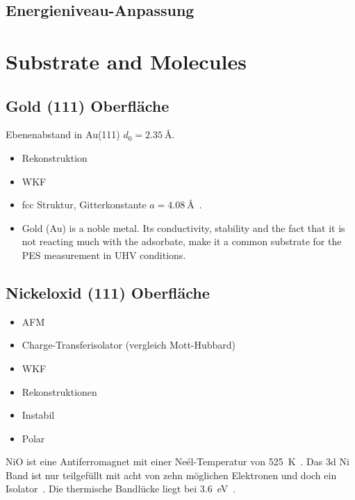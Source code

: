         \subsection{Energieniveau-Anpassung}

    \section{Substrate and Molecules}
        \subsection{Gold (111) Oberfläche}
            \textbf{\cite{5A_1}}
            Ebenenabstand in Au(111) $d_0 = \SI{2.35}{\angstrom}$.

            \begin{itemize}
                \item Rekonstruktion
                \item WKF
                \item fcc Struktur, Gitterkonstante  $a=\SI{4.08}{\angstrom}$~\cite{Marx}.
                \item Gold (Au) is a noble metal. Its conductivity, stability and the fact that it is not reacting much with the adsorbate, make it a common substrate for the PES measurement in UHV conditions.
            \end{itemize}


        \subsection{Nickeloxid (111) Oberfläche}
            \begin{itemize}
                \item AFM
                \item Charge-Transferisolator (vergleich Mott-Hubbard)
                \item WKF
                \item Rekonstruktionen
                \item Instabil
                \item Polar
            \end{itemize}
            NiO ist eine Antiferromagnet mit einer Neél-Temperatur von \SI{525}{\kelvin}~\cite{kunz_chemisorption_1985}.
            Das 3d Ni Band ist nur teilgefüllt mit acht von zehn möglichen Elektronen und doch ein Isolator~\cite{kunz_chemisorption_1985}.
            Die thermische Bandlücke liegt bei \SI{3.6}{\electronvolt}~\cite{kunz_chemisorption_1985}.

